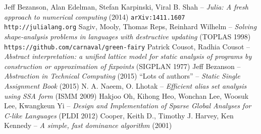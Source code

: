 \documentclass[11pt]{article}
\begin{document}
\newpage

\begin{thebibliography}{9}

 Jeff Bezanson, Alan Edelman, Stefan Karpinski, Viral B. Shah -- \emph{Julia: A fresh approach to numerical computing} (2014) \verb~arXiv:1411.1607~
 \verb~http://julialang.org~
 Sagiv, Mooly, Thomas Reps, Reinhard Wilhelm -- \emph{Solving shape-analysis problems in languages with destructive updating} (TOPLAS 1998)
 \verb~https://github.com/carnaval/green-fairy~
 Patrick Cousot, Radhia Cousot -- \emph{Abstract interpretation: a unified lattice model for static analysis of programs by construction or approximation of fixpoints} (SIGPLAN 1977)
 Jeff Bezanson -- \emph{Abstraction in Technical Computing} (2015)
 ``Lots of authors'' -- \emph{Static Single Assignment Book} (2015)
 N. A. Naeem, O. Lhotak -- \emph{Efficient alias set analysis using SSA form} (ISMM 2009)
 Hakjoo Oh, Kihong Heo, Wonchan Lee, Woosuk Lee, Kwangkeun Yi -- \emph{Design and Implementation of Sparse Global Analyses for C-like Languages} (PLDI 2012)
 Cooper, Keith D., Timothy J. Harvey, Ken Kennedy -- \emph{A simple, fast dominance algorithm} (2001)
\end{thebibliography}
\end{document}
